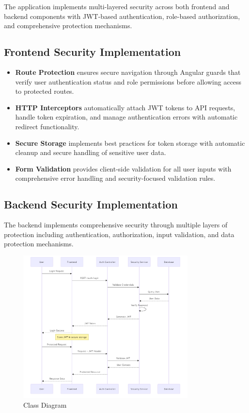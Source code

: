 \documentclass[12pt,a4paper]{article}
\begin{document}
The application implements multi-layered security across both frontend and backend components with JWT-based authentication, role-based authorization, and comprehensive protection mechanisms.

\subsection{Frontend Security Implementation}

\begin{itemize}
    \item \textbf{Route Protection} ensures secure navigation through Angular guards that verify user authentication status and role permissions before allowing access to protected routes.

    \item \textbf{HTTP Interceptors} automatically attach JWT tokens to API requests, handle token expiration, and manage authentication errors with automatic redirect functionality.

    \item \textbf{Secure Storage} implements best practices for token storage with automatic cleanup and secure handling of sensitive user data.

    \item \textbf{Form Validation} provides client-side validation for all user inputs with comprehensive error handling and security-focused validation rules.
\end{itemize}

\subsection{Backend Security Implementation}

The backend implements comprehensive security through multiple layers of protection including authentication, authorization, input validation, and data protection mechanisms.

\begin{figure}[H]
    \centering
    \includegraphics[width=0.8\textwidth]{sec2.png}
    \caption{Class Diagram}
\end{figure}
\end{document}
